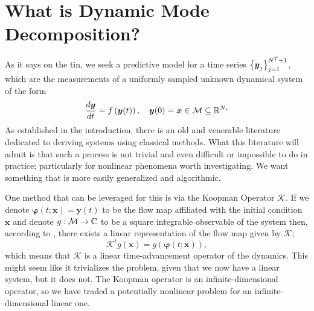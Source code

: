\section{What is Dynamic Mode Decomposition?}
As it says on the tin, we seek a predictive model for a time series 
$\left\{\boldsymbol{y}_j\right\}_{j=1}^{N^T+1}$, which are the measurements of a 
uniformly sampled unknown dynamical system of the form
\begin{equation}
    \frac{d\boldsymbol{y}}{dt} = f\left(\boldsymbol{y}(t)\right),\quad \boldsymbol{y}(0) 
    = \boldsymbol{x} \in \mathcal{M} \subseteq \mathbb{R}^{N_s}
\end{equation}
As established in the introduction, there is an old and venerable literature 
dedicated to deriving systems using classical methods. What this literature will 
admit is that such a process is not trivial and even difficult or impossible to 
do in practice; particularly for nonlinear phenomena worth investigating. We 
want something that is more easily generalized and algorithmic.

One method that can be leveraged for this is via the Koopman Operator 
$\mathcal{K}$. If we denote $\boldsymbol{\varphi}(t;\boldsymbol{x}) =
\boldsymbol{y}(t)$ to be the flow map affiliated with the initial condition 
$\boldsymbol{x}$ and denote $g: \mathcal{M} \to \mathbb{C}$ to be a square integrable 
observable of the system then, according to \cite{koopman}, there exists a 
linear representation of the flow map given by $\mathcal{K}$;
\begin{equation}
    \mathcal{K}^t g(\boldsymbol{x}) = g(\boldsymbol{\varphi}(t; \boldsymbol{x})),
\end{equation}
which means that $\mathcal{K}$ is a linear time-advancement operator of the 
dynamics. This might seem like it trivializes the problem, given that we now 
have a linear system, but it does not. The Koopman operator is an 
infinite-dimensional operator, so we have traded a potentially nonlinear 
problem for an infinite-dimensional linear one.

